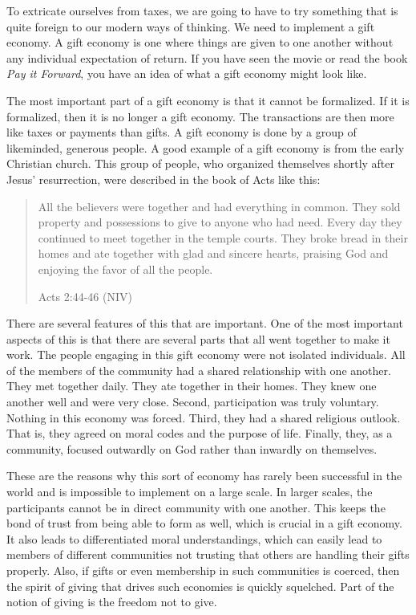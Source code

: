 To extricate ourselves from taxes, we are going to have to try something
that is quite foreign to our modern ways of thinking. We need to
implement a gift economy. A gift economy is one where things are given
to one another without any individual expectation of return. If you
have seen the movie or read the book \textit{Pay it Forward}, you have
an idea of what a gift economy might look like.

The most important part of a gift economy is that it cannot be
formalized. If it is formalized, then it is no longer a gift economy.
The transactions are then more like taxes or payments than gifts. A
gift economy is done by a group of likeminded, generous people. A good
example of a gift economy is from the early Christian church. This
group of people, who organized themselves shortly after Jesus’
resurrection, were described in the book of Acts like this:

\begin{quote}
All the believers were together and had everything in common. They sold
property and possessions to give to anyone who had need. Every day they
continued to meet together in the temple courts. They broke bread in
their homes and ate together with glad and sincere hearts, praising God
and enjoying the favor of all the people. 

Acts 2:44-46 (NIV)
\end{quote}

There are several features of this that are important. One of the most
important aspects of this is that there are several parts that all went
together to make it work. The people engaging in this gift economy were
not isolated individuals. All of the members of the community had a
shared relationship with one another. They met together daily. They ate
together in their homes. They knew one another well and were very
close. Second, participation was truly voluntary. Nothing in this
economy was forced. Third, they had a shared religious outlook. That
is, they agreed on moral codes and the purpose of life. Finally, they,
as a community, focused outwardly on God rather than inwardly on
themselves.

These are the reasons why this sort of economy has rarely been
successful in the world and is impossible to implement on a large
scale. In larger scales, the participants cannot be in direct community
with one another. This keeps the bond of trust from being able to form
as well, which is crucial
in a gift economy. It
also leads to differentiated moral understandings, which can easily
lead to members of different communities not trusting that
others are handling
their gifts properly. Also, if gifts or even membership in such
communities is coerced, then the spirit of giving that drives such
economies is quickly squelched. Part of the notion of giving is the
freedom not to give.


